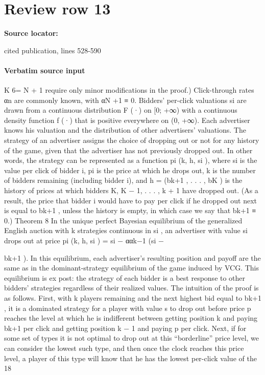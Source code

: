 \documentclass[10pt]{article}
\begin{document}
\section*{Review row 13}
\textbf{Source locator:} {\footnotesize\raggedright cited publication, lines 528-\allowbreak{}590\par}
\paragraph{Verbatim source input}
\begin{ReviewVerbatim}
K 6= N + 1 require only minor modifications in the proof.) Click-through rates αn are commonly
known, with αN +1 ≡ 0. Bidders’ per-click valuations si are drawn from a continuous distribution
F (·) on [0; +∞) with a continuous density function f (·) that is positive everywhere on (0, +∞).
Each advertiser knows his valuation and the distribution of other advertisers’ valuations.
The strategy of an advertiser assigns the choice of dropping out or not for any history of the
game, given that the advertiser has not previously dropped out. In other words, the strategy can be
represented as a function pi (k, h, si ), where si is the value per click of bidder i, pi is the price at which
he drops out, k is the number of bidders remaining (including bidder i), and h = (bk+1 , . . . , bK ) is
the history of prices at which bidders K, K − 1, . . . , k + 1 have dropped out. (As a result, the
price that bidder i would have to pay per click if he dropped out next is equal to bk+1 , unless the
history is empty, in which case we say that bk+1 ≡ 0.)
Theorem 8 In the unique perfect Bayesian equilibrium of the generalized English auction with
k
strategies continuous in si , an advertiser with value si drops out at price pi (k, h, si ) = si − ααk−1
(si −

bk+1 ). In this equilibrium, each advertiser’s resulting position and payoff are the same as in the
dominant-strategy equilibrium of the game induced by VCG. This equilibrium is ex post: the strategy
of each bidder is a best response to other bidders’ strategies regardless of their realized values.
The intuition of the proof is as follows. First, with k players remaining and the next highest
bid equal to bk+1 , it is a dominated strategy for a player with value s to drop out before price p
reaches the level at which he is indifferent between getting position k and paying bk+1 per click and
getting position k − 1 and paying p per click. Next, if for some set of types it is not optimal to drop
out at this “borderline” price level, we can consider the lowest such type, and then once the clock
reaches this price level, a player of this type will know that he has the lowest per-click value of the
18


\end{ReviewVerbatim}
\end{document}
